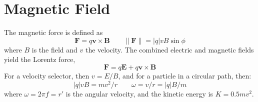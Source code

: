 \documentclass{tufte-book}
\renewcommand{\b}{\mathbf}
\begin{document}
\section{Magnetic Field}
The magnetic force is defined as \begin{equation}
    \b F = q \b v \times \b B \qquad \| \b F \| = |q| v B \sin \phi
\end{equation}
where $B$ is the field and $v$ the velocity. The combined electric and magnetic fields yield the Lorentz force,
\begin{equation}
    \b F = q \b E + q \b v \times \b B
\end{equation}
For a velocity selector, then $v = E/B$, and for a particle in a circular path, then: \begin{equation}
    |q|v B = mv^2/r \qquad \omega = v/r = |q|B/m
\end{equation}
where $\omega = 2 \pi f = r'$ is the angular velocity, and the kinetic energy is $K = 0.5 mv^2$.
\end{document}
